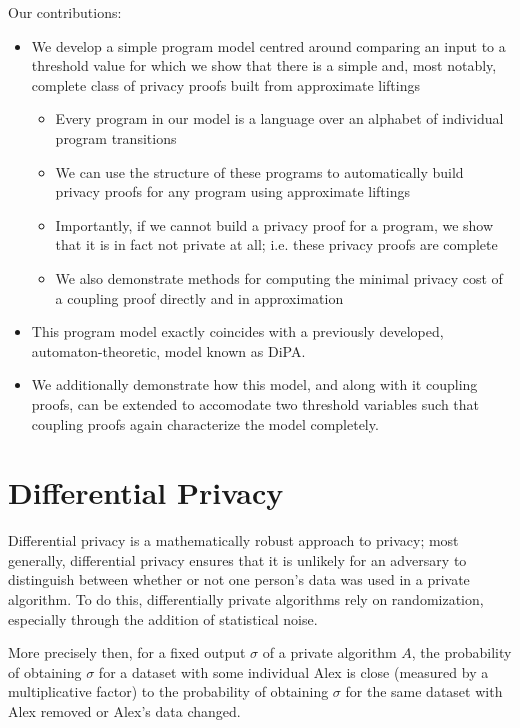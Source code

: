 \documentclass[12pt]{article}
\theoremstyle{definition}
\begin{document}
Our contributions:
\begin{itemize}
    \item We develop a simple program model centred around comparing an input to a threshold value for which we show that there is a simple and, most notably, complete class of privacy proofs built from approximate liftings
    \begin{itemize}
        \item Every program in our model is a language over an alphabet of individual program transitions
        \item We can use the structure of these programs to automatically build privacy proofs for any program using approximate liftings
        \item Importantly, if we cannot build a privacy proof for a program, we show that it is in fact not private at all; i.e. these privacy proofs are complete
        \item We also demonstrate methods for computing the minimal privacy cost of a coupling proof directly and in approximation
    \end{itemize}
    \item This program model exactly coincides with a previously developed, automaton-theoretic, model known as DiPA. 
    \item We additionally demonstrate how this model, and along with it coupling proofs, can be extended to accomodate two threshold variables such that coupling proofs again characterize the model completely. 
\end{itemize}

\section{Differential Privacy}

Differential privacy is a mathematically robust approach to privacy; most generally, differential privacy ensures that it is unlikely for an adversary to distinguish between whether or not one person's data was used in a private algorithm. To do this, differentially private algorithms rely on randomization, especially through the addition of statistical noise.

More precisely then, for a fixed output $\sigma$ of a private algorithm $A$, the probability of obtaining $\sigma$ for a dataset with some individual Alex is close (measured by a multiplicative factor) to the probability of obtaining $\sigma$ for the same dataset with Alex removed or Alex's data changed.
\end{document}
